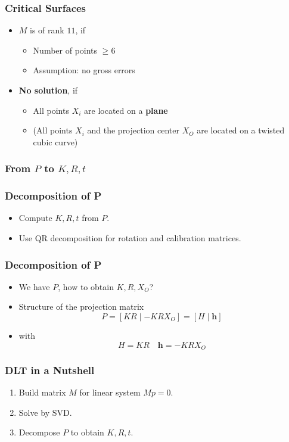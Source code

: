 \begin{frame}
  \frametitle{Critical Surfaces}
  \begin{itemize}
      \item $M$ is of rank $11$, if
      \begin{itemize}
          \item Number of points $\geq 6$
          \item Assumption: no gross errors
      \end{itemize}
      \item \textbf{No solution}, if
      \begin{itemize}
          \item All points $X_i$ are located on a \textbf{plane}
          \item (All points $X_i$ and the projection center $X_O$ are located on a twisted cubic curve)
      \end{itemize}
  \end{itemize}
\end{frame}

\begin{frame}
  \frametitle{From $P$ to $K,R,t$}
\end{frame}

\begin{frame}
  \frametitle{Decomposition of P}
  \begin{itemize}
    \item Compute $K, R, t$ from $P$.
    \item Use QR decomposition for rotation and calibration matrices.
  \end{itemize}
\end{frame}


\begin{frame}
  \frametitle{Decomposition of P}
  \begin{itemize}
      \item We have $P$, how to obtain $K, R, X_O$?
      \item Structure of the projection matrix
      $$P = [KR \mid -KRX_O] = [H \mid \mathbf{h}]$$
      \item with
      $$H = KR \quad \mathbf{h} = -KRX_O$$
  \end{itemize}
\end{frame}


\begin{frame}
  \frametitle{DLT in a Nutshell}
  \begin{enumerate}
    \item Build matrix $M$ for linear system $M p = 0$.
    \item Solve by SVD.
    \item Decompose $P$ to obtain $K,R,t$.
  \end{enumerate}
\end{frame}


